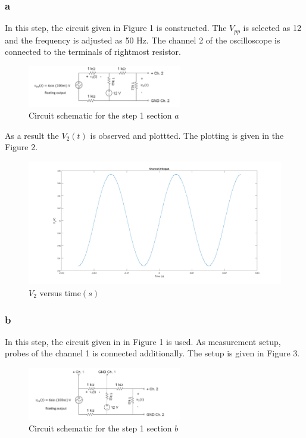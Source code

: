 \documentclass[letterpaper,12pt]{article}
\begin{document}
\subsubsection{a} In this step, the circuit given in Figure 1 is constructed. The \(V_{pp}\) is selected as 12 and the frequency is adjusted as 50 Hz. The channel 2 of the oscilloscope is connected to the terminals of rightmost resistor. 
\begin{figure}[H]
	\centering
   \includegraphics[width=0.6\textwidth]{1a_sch.png}
   \caption{Circuit schematic for the step 1 section \(a\)}
\end{figure} 
As a result the \(V_2(t)\) is observed and plottted. The plotting is given in the Figure 2. 
\begin{figure}[H]
	\centering
   \includegraphics[width=1\textwidth]{1a.png}
   \caption{\(V_2\) versus time\((s)\) }
\end{figure} 


\subsubsection{b} 
In this step, the circuit given in in Figure 1 is used. As measurement setup, probes of the channel 1 is connected additionally. The setup is given in Figure 3. 

\begin{figure}[H]
	\centering
   \includegraphics[width=0.6\textwidth]{1b_sch.png}
   \caption{Circuit schematic for the step 1 section \(b\)}
\end{figure} 
\end{document}
